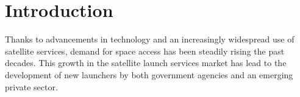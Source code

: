 \chapter{Introduction}

Thanks to advancements in technology and an increasingly widespread use of satellite services, demand for space access has been steadily rising the past decades. This growth in the satellite launch services market has lead to the development of new launchers by both government agencies and an emerging private sector. 

